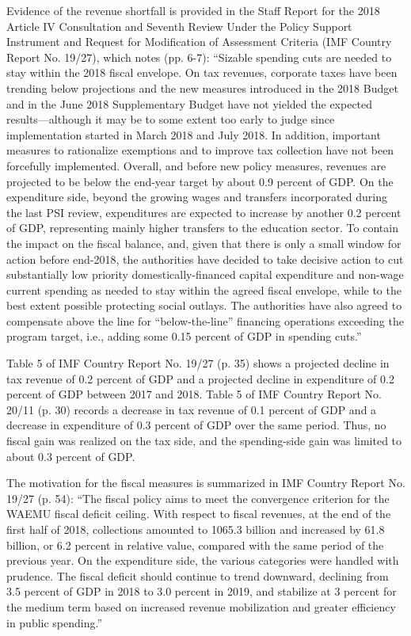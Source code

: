 Evidence of the revenue shortfall is provided in the Staff Report for the 2018 Article IV Consultation and Seventh Review Under the Policy Support Instrument and Request for Modification of Assessment Criteria (IMF Country Report No. 19/27), which notes (pp. 6-7): “Sizable spending cuts are needed to stay within the 2018 fiscal envelope. On tax revenues, corporate taxes have been trending below projections and the new measures introduced in the 2018 Budget and in the June 2018 Supplementary Budget have not yielded the expected results—although it may be to some extent too early to judge since implementation started in March 2018 and July 2018. In addition, important measures to rationalize exemptions and to improve tax collection have not been forcefully implemented. Overall, and before new policy measures, revenues are projected to be below the end-year target by about 0.9 percent of GDP. On the expenditure side, beyond the growing wages and transfers incorporated during the last PSI review, expenditures are expected to increase by another 0.2 percent of GDP, representing mainly higher transfers to the education sector. To contain the impact on the fiscal balance, and, given that there is only a small window for action before end-2018, the authorities have decided to take decisive action to cut substantially low priority domestically-financed capital expenditure and non-wage current spending as needed to stay within the agreed fiscal envelope, while to the best extent possible protecting social outlays. The authorities have also agreed to compensate above the line for “below-the-line” financing operations exceeding the program target, i.e., adding some 0.15 percent of GDP in spending cuts.”

Table 5 of IMF Country Report No. 19/27 (p. 35) shows a projected decline in tax revenue of 0.2 percent of GDP and a projected decline in expenditure of 0.2 percent of GDP between 2017 and 2018.  Table 5 of IMF Country Report No. 20/11 (p. 30) records a decrease in tax revenue of 0.1 percent of GDP and a decrease in expenditure of 0.3 percent of GDP over the same period. Thus, no fiscal gain was realized on the tax side, and the spending-side gain was limited to about 0.3 percent of GDP. 

The motivation for the fiscal measures is summarized in IMF Country Report No. 19/27 (p. 54): “The fiscal policy aims to meet the convergence criterion for the WAEMU fiscal deficit ceiling. With respect to fiscal revenues, at the end of the first half of 2018, collections amounted to 1065.3 billion and increased by 61.8 billion, or 6.2 percent in relative value, compared with the same period of the previous year. On the expenditure side, the various categories were handled with prudence. The fiscal deficit should continue to trend downward, declining from 3.5 percent of GDP in 2018 to 3.0 percent in 2019, and stabilize at 3 percent for the medium term based on increased revenue mobilization and greater efficiency in public spending.”

